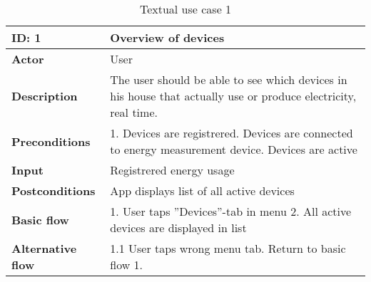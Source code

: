 \begin{table}[H]
\begin{tabular}{|l|p{11.7cm}|}
\hline
\textbf{ID:} 1&\textbf{Overview of devices}\\\hline
\textbf{Actor} &User\\\hline
\textbf{Description}&
The user should be able to see which devices in his house that actually use or produce electricity, real time.\\\hline
\textbf{Preconditions}&
1. Devices are registrered\newline
2. Devices are connected to energy measurement device\newline
3. Devices are active\\\hline
\textbf{Input}&
Registrered energy usage\\\hline
\textbf{Postconditions}& App displays list of all active devices\\\hline
\textbf{Basic flow}&
1. User taps ''Devices''-tab in menu
2. All active devices are displayed in list\\\hline
\textbf{Alternative flow}&
1.1 User taps wrong menu tab. Return to basic flow 1.\\\hline
\end{tabular}
\caption{Textual use case 1}
\end{table}




